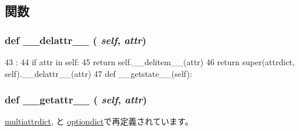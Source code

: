 \subsection{関数}
\hypertarget{classm5_1_1util_1_1attrdict_1_1attrdict_a83e04d6bd123100dc03d474fd47b2e7a}{
\subsubsection[{\_\-\_\-delattr\_\-\_\-}]{\setlength{\rightskip}{0pt plus 5cm}def \_\-\_\-delattr\_\-\_\- ( {\em self}, \/   {\em attr})}}
\label{classm5_1_1util_1_1attrdict_1_1attrdict_a83e04d6bd123100dc03d474fd47b2e7a}



\begin{DoxyCode}
43                                :
44         if attr in self:
45             return self.__delitem__(attr)
46         return super(attrdict, self).__delattr__(attr)
47 
    def __getstate__(self):
\end{DoxyCode}
\hypertarget{classm5_1_1util_1_1attrdict_1_1attrdict_a0a990b3ec3889d40889daca9ee5e4695}{
\subsubsection[{\_\-\_\-getattr\_\-\_\-}]{\setlength{\rightskip}{0pt plus 5cm}def \_\-\_\-getattr\_\-\_\- ( {\em self}, \/   {\em attr})}}
\label{classm5_1_1util_1_1attrdict_1_1attrdict_a0a990b3ec3889d40889daca9ee5e4695}


\hyperlink{classm5_1_1util_1_1attrdict_1_1multiattrdict_a0a990b3ec3889d40889daca9ee5e4695}{multiattrdict}, と \hyperlink{classm5_1_1util_1_1attrdict_1_1optiondict_a0a990b3ec3889d40889daca9ee5e4695}{optiondict}で再定義されています。


